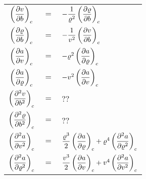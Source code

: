 {\setlength{\tabcolsep}{.2em}
\begin{tabularx}{\linewidth}{ccl}
\toprule
$\der{v}{b}{c}$ & $=$ & $-\dfrac{1}{\varrho^2} \der{\varrho}{b}{c}$ \\[12pt]
$\der{\varrho}{b}{c}$ & $=$ & $-\dfrac{1}{v^2} \der{v}{b}{c}$ \\
\midrule
$\der{a}{v}{c}$ & $=$ & $-\varrho^2 \der{a}{\varrho}{c}$ \\[12pt]
$\der{a}{\varrho}{c}$ & $=$ & $-v^2 \der{a}{v}{c}$ \\
\midrule
$\der{^2 v}{b^2}{c}$ & $=$ & $??$ \\[12pt]
$\der{^2 \varrho}{b^2}{c}$ & $=$ & $??$ \\
\midrule
$\der{^2 a}{v^2}{c}$ & $=$ & $\dfrac{\varrho^3}{2} \der{a}{\varrho}{c} + \varrho^4 \der{^2 a}{\varrho^2}{c}$ \\[12pt]
$\der{^2 a}{\varrho^2}{c}$ & $=$ & $\dfrac{v^3}{2} \der{a}{v}{c} + v^4 \der{^2 a}{v^2}{c}$ \\
\bottomrule
\end{tabularx}%
}